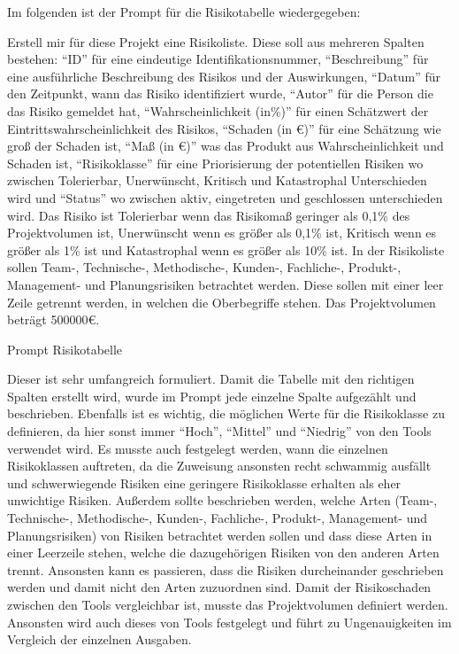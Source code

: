 Im folgenden ist der Prompt für die Risikotabelle wiedergegeben:

\begin{prompt}[H]
    \begin{tcolorbox}[colback=gray!20, colframe=gray!20, boxrule=0pt, sharp corners] 
        Erstell mir für diese Projekt eine Risikoliste. Diese soll aus mehreren Spalten bestehen: ``ID'' für eine 
        eindeutige Identifikationsnummer, ``Beschreibung'' für eine ausführliche Beschreibung des Risikos und der 
        Auswirkungen, ``Datum'' für den Zeitpunkt, wann das Risiko identifiziert wurde, ``Autor'' für die Person die 
        das Risiko gemeldet hat, ``Wahrscheinlichkeit (in\%)'' für einen Schätzwert der Eintrittswahrscheinlichkeit 
        des Risikos, ``Schaden (in €)'' für eine Schätzung wie groß der Schaden ist, ``Maß (in €)'' was das Produkt aus 
        Wahrscheinlichkeit und Schaden ist, ``Risikoklasse'' für eine Priorisierung der potentiellen Risiken wo 
        zwischen Tolerierbar, Unerwünscht, Kritisch und Katastrophal Unterschieden wird und ``Status'' wo zwischen 
        aktiv, eingetreten und geschlossen unterschieden wird. Das Risiko ist Tolerierbar wenn das Risikomaß geringer 
        als 0,1\% des Projektvolumen ist, Unerwünscht wenn es größer als 0,1\% ist, Kritisch wenn es größer als 1\% 
        ist und Katastrophal wenn es größer als 10\% ist. In der Risikoliste sollen Team-, Technische-, Methodische-, 
        Kunden-, Fachliche-, Produkt-, Management- und Planungsrisiken betrachtet werden. Diese sollen mit einer 
        leer Zeile getrennt werden, in welchen die Oberbegriffe stehen. Das Projektvolumen beträgt 500000€.
        \vfill
    \end{tcolorbox}
    \caption{Prompt Risikotabelle}
    \label{Prompt Risikotabelle}
\end{prompt}

Dieser ist sehr umfangreich formuliert. Damit die Tabelle mit den richtigen Spalten erstellt wird, wurde im Prompt jede
einzelne Spalte aufgezählt und beschrieben. Ebenfalls ist es wichtig, die möglichen Werte für die Risikoklasse zu 
definieren, da hier sonst immer ``Hoch'', ``Mittel'' und ``Niedrig'' von den Tools verwendet wird. Es musste auch 
festgelegt werden, wann die einzelnen Risikoklassen auftreten, da die Zuweisung ansonsten recht schwammig ausfällt und
schwerwiegende Risiken eine geringere Risikoklasse erhalten als eher unwichtige Risiken. Außerdem sollte beschrieben 
werden, welche Arten (Team-, Technische-, Methodische-, Kunden-, Fachliche-, Produkt-, Management- und Planungsrisiken) 
von Risiken betrachtet werden sollen und dass diese Arten in einer Leerzeile stehen, welche die dazugehörigen Risiken von 
den anderen Arten trennt. Ansonsten kann es passieren, dass die Risiken durcheinander geschrieben werden und damit nicht 
den Arten zuzuordnen sind. Damit der Risikoschaden zwischen den Tools vergleichbar ist, musste das Projektvolumen definiert 
werden. Ansonsten wird auch dieses von Tools festgelegt und führt zu Ungenauigkeiten im Vergleich der einzelnen Ausgaben.

